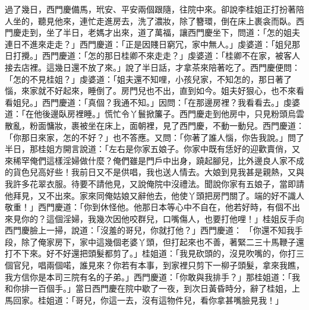 過了幾日，西門慶備馬，玳安、平安兩個跟隨，往院中來。卻說李桂姐正打扮著陪人坐的，聽見他來，連忙走進房去，洗了濃妝，除了簪環，倒在床上裹衾而臥。西門慶走到，坐了半日，老媽才出來，道了萬福，讓西門慶坐下，問道：「怎的姐夫連日不進來走走？」西門慶道：「正是因賤日窮冗，家中無人。」虔婆道：「姐兒那日打攪。」西門慶道：「怎的那日桂卿不來走走？」虔婆道：「桂卿不在家，被客人接去店裡。這幾日還不放了來。」說了半日話，才拿茶來陪著吃了。西門慶便問：「怎的不見桂姐？」虔婆道：「姐夫還不知哩，小孩兒家，不知怎的，那日著了惱，來家就不好起來，睡倒了。房門兒也不出，直到如今。姐夫好狠心，也不來看看姐兒。」西門慶道：「真個？我通不知。」因問：「在那邊房裡？我看看去。」虔婆道：「在他後邊臥房裡睡。」慌忙令丫鬟掀簾子。西門慶走到他房中，只見粉頭烏雲散亂，粉面慵妝，裹被坐在床上，面朝裡，見了西門慶，不動一動兒。西門慶道：「你那日來家，怎的不好？」也不答應。又問：「你著了誰人惱，你告我說。」問了半日，那桂姐方開言說道：「左右是你家五娘子。你家中既有恁好的迎歡賣俏，又來稀罕俺們這樣淫婦做什麼？俺們雖是門戶中出身，蹺起腳兒，比外邊良人家不成的貨色兒高好些！我前日又不是供唱，我也送人情去。大娘到見我甚是親熱，又與我許多花翠衣服。待要不請他見，又說俺院中沒禮法。聞說你家有五娘子，當即請他拜見，又不出來。家來同俺姑娘又辭他去，他使丫頭把房門關了。端的好不識人敬重！」西門慶道：「你到休怪他。他那日本等心中不自在，他若好時，有個不出來見你的？這個淫婦，我幾次因他咬群兒，口嘴傷人，也要打他哩！」桂姐反手向西門慶臉上一掃，說道：「沒羞的哥兒，你就打他？」西門慶道： 「你還不知我手段，除了俺家房下，家中這幾個老婆丫頭，但打起來也不善，著緊二三十馬鞭子還打不下來。好不好還把頭髮都剪了。」桂姐道：「我見砍頭的，沒見吹嘴的，你打三個官兒，唱兩個喏，誰見來？你若有本事，到家裡只剪下一柳子頭髮，拿來我瞧，我方信你是本司三院有名的子弟。」西門慶道：「你敢與我排手？」那桂姐道：「我和你排一百個手。」當日西門慶在院中歇了一夜，到次日黃昏時分，辭了桂姐，上馬回家。桂姐道：「哥兒，你這一去，沒有這物件兒，看你拿甚嘴臉見我！」

